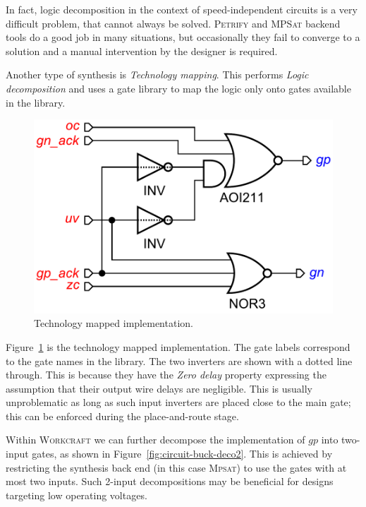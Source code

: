 \documentclass[british, journal]{IEEEtran}
\newcommand{\noun}[1]{\textsc{#1}}
\begin{document}
In fact, logic decomposition in the context of speed-independent circuits is a
very difficult problem,
that cannot always be solved. \noun{Petrify} and \noun{MPSat} backend tools do a
good job in many situations,
but occasionally they fail to converge to a solution and a manual intervention
by the designer is required.

Another type of synthesis is \emph{Technology mapping}. This performs
\emph{Logic decomposition} and uses a gate library to map the logic only onto
gates available in the library.

\begin{figure}[h]
\begin{centering}
\includegraphics[scale=0.3]{Images/circuit-buck-mapped-pfy-wc.pdf}
\par\end{centering}

\protect\caption{\label{fig:tech-mapped-circuit}Technology mapped
implementation.}
\end{figure}

Figure~\ref{fig:tech-mapped-circuit} is the technology mapped implementation.
The gate labels correspond to the gate names in the library.
The two inverters are shown with a dotted line through.
This is because they have the \emph{Zero delay} property expressing the
assumption that their output wire delays are negligible.
This is usually unproblematic as long as such input inverters are placed close
to the main gate;
this can be enforced during the place-and-route stage.

Within \noun{Workcraft} we can further decompose the implementation of $gp$ into
two-input gates,
as shown in Figure~\ref{fig:circuit-buck-deco2}. This is achieved by restricting
the synthesis
back end (in this case \noun{Mpsat}) to use the gates with at most two inputs.
Such 2-input decompositions may be beneficial for designs targeting low
operating voltages.
\end{document}

